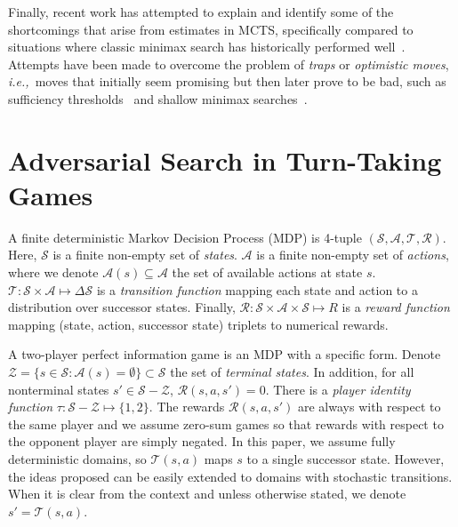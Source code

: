 \documentclass[conference]{IEEEtran}
\newcommand{\cA}{\mathcal{A}}
\newcommand{\cR}{\mathcal{R}}
\newcommand{\cS}{\mathcal{S}}
\newcommand{\cT}{\mathcal{T}}
\newcommand{\cZ}{\mathcal{Z}}
\newcommand{\ie}{{\it i.e.,}~}
\begin{document}
Finally, recent work has attempted to explain and identify some of the shortcomings that arise from estimates in 
MCTS, specifically compared to situations where classic minimax search has historically performed 
well~\cite{Ramanujan10Understanding,Ramanujan10On}. 
Attempts have been made to overcome the problem of {\it traps} or {\it optimistic moves}, \ie moves that initially seem 
promising but then later prove to be bad, such as sufficiency 
thresholds~\cite{Gudmindsson13Sufficiency} and shallow minimax searches~\cite{Baier13MinimaxHybrids}. 


\section{Adversarial Search in Turn-Taking Games}


A finite deterministic Markov Decision Process (MDP) is 4-tuple $(\cS, \cA, \cT, \cR)$. Here, $\cS$ is a finite non-empty set of {\it states}. 
$\cA$ is a finite non-empty set of {\it actions}, where we denote $\cA(s) \subseteq \cA$ the set of available actions at state $s$. 
$\cT : \cS \times \cA \mapsto \Delta \cS$ is a {\it transition function} mapping 
each state and action to a distribution over successor states. Finally, $\cR : \cS \times \cA \times \cS \mapsto R$ 
is a {\it reward function} mapping (state, action, successor state) triplets to numerical rewards. 

A two-player perfect information game is an MDP with a specific form. 
Denote $\cZ = \{ s \in \cS: \cA(s) = \emptyset \} \subset \cS$ the set of {\it terminal states}. 
In addition, for all nonterminal states $s' \in \cS - \cZ$, $\cR(s,a,s') = 0$. 
There is a {\it player identity function} $\tau : \cS - \cZ \mapsto \{1,2\}$. 
The rewards $\cR(s,a,s')$ are always with respect to the same player and  
we assume zero-sum games so that rewards with respect to the opponent player are simply negated. 
In this paper, we assume fully deterministic domains, so $\cT(s,a)$ maps $s$ to a single successor 
state. 
However, the ideas proposed can be easily extended to domains with stochastic transitions. 
When it is clear from the context and unless otherwise stated, we denote $s' = \cT(s,a)$. 
\end{document}
